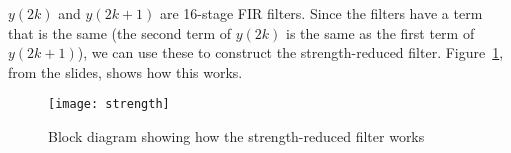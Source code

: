 $y(2k)$ and $y(2k+1)$ are 16-stage FIR filters.
Since the filters have a term that is the same (the second term of $y(2k)$ is the same as the first term of $y(2k+1)$), we can use these to construct the strength-reduced filter.
Figure~\ref{fig:design:strength}, from the slides, shows how this works.

\begin{figure}[h]
	\centering
	\texttt{[image: strength]}
	\caption{Block diagram showing how the strength-reduced filter works}
	\label{fig:design:strength}
\end{figure}
